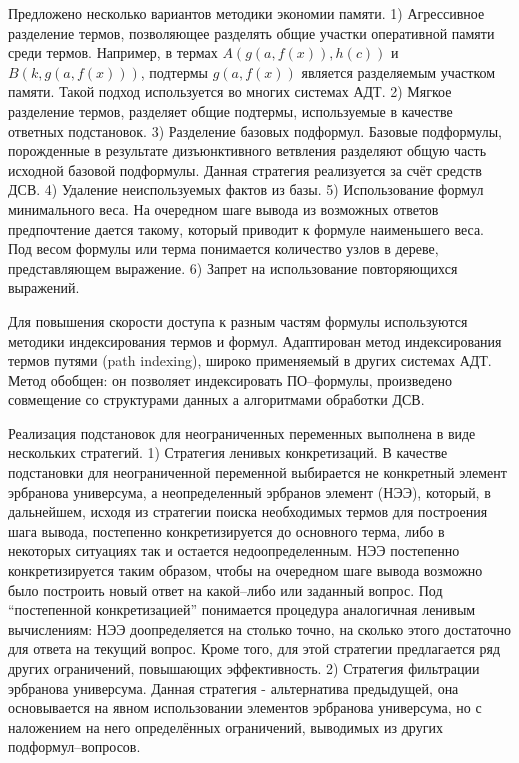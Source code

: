\documentclass[a4paper]{report}
\begin{document}
Предложено несколько вариантов методики экономии памяти. 1) Агрессивное разделение термов, позволяющее разделять общие участки оперативной памяти среди термов. Например, в термах $A(g(a,f(x)),h(c))$ и $B(k,g(a,f(x)))$, подтермы $g(a,f(x))$ является разделяемым участком памяти. Такой подход используется во многих системах АДТ. 2) Мягкое разделение термов, разделяет общие подтермы, используемые в качестве ответных подстановок. 3) Разделение базовых подформул. Базовые подформулы, порожденные в результате дизъюнктивного ветвления разделяют общую часть исходной базовой подформулы. Данная стратегия реализуется за счёт средств ДСВ. 4) Удаление неиспользуемых фактов из базы. 5) Использование формул минимального веса. На очередном шаге вывода из возможных ответов предпочтение дается такому, который приводит к формуле наименьшего веса. Под весом формулы или терма понимается количество узлов в дереве, представляющем выражение. 6) Запрет на использование повторяющихся выражений.

Для повышения скорости доступа к разным частям формулы используются методики индексирования термов и формул. Адаптирован метод индексирования термов путями (path indexing), широко применяемый в других системах АДТ. Метод обобщен: он позволяет индексировать ПО--формулы, произведено совмещение со структурами данных а алгоритмами обработки ДСВ.

Реализация подстановок для неограниченных переменных выполнена в виде нескольких стратегий. 1) Стратегия ленивых конкретизаций. В качестве подстановки для неограниченной переменной выбирается не конкретный элемент эрбранова универсума, а неопределенный эрбранов элемент (НЭЭ), который, в дальнейшем, исходя из стратегии поиска необходимых термов для построения шага вывода, постепенно конкретизируется до основного терма, либо в некоторых ситуациях так и остается недоопределенным. НЭЭ постепенно конкретизируется таким образом, чтобы на очередном шаге вывода возможно было построить новый ответ на какой--либо или заданный вопрос. Под ``постепенной конкретизацией'' понимается процедура аналогичная ленивым вычислениям: НЭЭ доопределяется на столько точно, на сколько этого достаточно для ответа на текущий вопрос. Кроме того, для этой стратегии предлагается ряд других ограничений, повышающих эффективность.  2) Стратегия фильтрации эрбранова универсума. Данная стратегия - альтернатива предыдущей, она основывается на явном использовании элементов эрбранова универсума, но с наложением на него определённых ограничений, выводимых из других подформул--вопросов.
\end{document}
